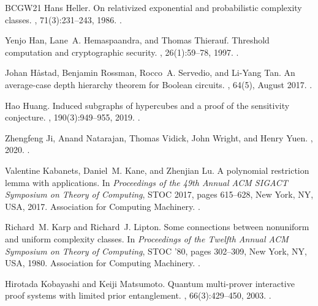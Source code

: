 \documentclass[10pt,a4paper]{article}
\begin{document}
\begin{thebibliography}{BCGW21}
Hans Heller.
\newblock On relativized exponential and probabilistic complexity classes.
, 71(3):231--243, 1986.
\newblock \href {https://doi.org/10.1016/S0019-9958(86)80012-2}
  {}.

Yenjo Han, Lane~A. Hemaspaandra, and Thomas Thierauf.
\newblock Threshold computation and cryptographic security.
, 26(1):59--78, 1997.
\newblock \href {https://doi.org/10.1137/S0097539792240467}
  {}.

Johan H\r{a}stad, Benjamin Rossman, Rocco~A. Servedio, and Li-Yang Tan.
\newblock An average-case depth hierarchy theorem for {B}oolean circuits.
, 64(5), August 2017.
\newblock \href {https://doi.org/10.1145/3095799} {}.

Hao Huang.
\newblock Induced subgraphs of hypercubes and a proof of the sensitivity
  conjecture.
, 190(3):949--955, 2019.
\newblock \href {https://doi.org/10.4007/annals.2019.190.3.6}
  {}.

Zhengfeng Ji, Anand Natarajan, Thomas Vidick, John Wright, and Henry Yuen.
, 2020.
\newblock \href {https://arxiv.org/abs/2001.04383} {}.

Valentine Kabanets, Daniel~M. Kane, and Zhenjian Lu.
\newblock A polynomial restriction lemma with applications.
\newblock In {\em Proceedings of the 49th Annual ACM SIGACT Symposium on Theory
  of Computing}, STOC 2017, pages 615--628, New York, NY, USA, 2017.
  Association for Computing Machinery.
\newblock \href {https://doi.org/10.1145/3055399.3055470}
  {}.

Richard~M. Karp and Richard~J. Lipton.
\newblock Some connections between nonuniform and uniform complexity classes.
\newblock In {\em Proceedings of the Twelfth Annual ACM Symposium on Theory of
  Computing}, STOC '80, pages 302--309, New York, NY, USA, 1980. Association
  for Computing Machinery.
\newblock \href {https://doi.org/10.1145/800141.804678}
  {}.

Hirotada Kobayashi and Keiji Matsumoto.
\newblock Quantum multi-prover interactive proof systems with limited prior
  entanglement.
, 66(3):429--450, 2003.
\newblock \href {https://doi.org/10.1016/S0022-0000(03)00035-7}
  {}.


\end{thebibliography}
\end{document}
